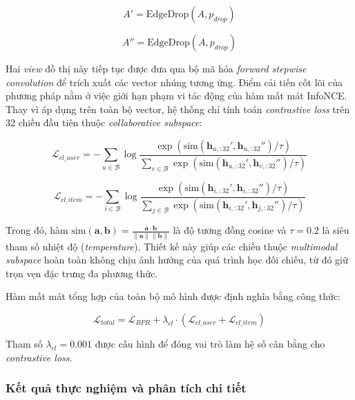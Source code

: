 \begin{equation}
A' = \text{EdgeDrop}(A, p_{drop})
\end{equation}

\begin{equation}
A'' = \text{EdgeDrop}(A, p_{drop})
\end{equation}

Hai \textit{view} đồ thị này tiếp tục được đưa qua bộ mã hóa \textit{forward stepwise convolution} để trích xuất các vector nhúng tương ứng. Điểm cải tiến cốt lõi của phương pháp nằm ở việc giới hạn phạm vi tác động của hàm mất mát InfoNCE. Thay vì áp dụng trên toàn bộ vector, hệ thống chỉ tính toán \textit{contrastive loss} trên 32 chiều đầu tiên thuộc \textit{collaborative subspace}:

\begin{equation}
\mathcal{L}_{cl\_user} = -\sum_{u \in \mathcal{B}} \log \frac{\exp(\text{sim}(\mathbf{h}_{u,:32}', \mathbf{h}_{u,:32}'') / \tau)}{\sum_{v \in \mathcal{B}} \exp(\text{sim}(\mathbf{h}_{u,:32}', \mathbf{h}_{v,:32}'') / \tau)}
\end{equation}

\begin{equation}
\mathcal{L}_{cl\_item} = -\sum_{i \in \mathcal{B}} \log \frac{\exp(\text{sim}(\mathbf{h}_{i,:32}', \mathbf{h}_{i,:32}'') / \tau)}{\sum_{j \in \mathcal{B}} \exp(\text{sim}(\mathbf{h}_{i,:32}', \mathbf{h}_{j,:32}'') / \tau)}
\end{equation}

Trong đó, hàm $\text{sim}(\mathbf{a}, \mathbf{b}) = \frac{\mathbf{a} \cdot \mathbf{b}}{\|\mathbf{a}\| \|\mathbf{b}\|}$ là độ tương đồng cosine và $\tau=0.2$ là siêu tham số nhiệt độ (\textit{temperature}). Thiết kế này giúp các chiều thuộc \textit{multimodal subspace} hoàn toàn không chịu ảnh hưởng của quá trình học đối chiếu, từ đó giữ trọn vẹn đặc trưng đa phương thức.

Hàm mất mát tổng hợp của toàn bộ mô hình được định nghĩa bằng công thức:

\begin{equation}
\mathcal{L}_{total} = \mathcal{L}_{BPR} + \lambda_{cl} \cdot \left( \mathcal{L}_{cl\_user} + \mathcal{L}_{cl\_item} \right)
\end{equation}

Tham số $\lambda_{cl}=0.001$ được cấu hình để đóng vai trò làm hệ số cân bằng cho \textit{contrastive loss}.

\subsubsection{Kết quả thực nghiệm và phân tích chi tiết}

